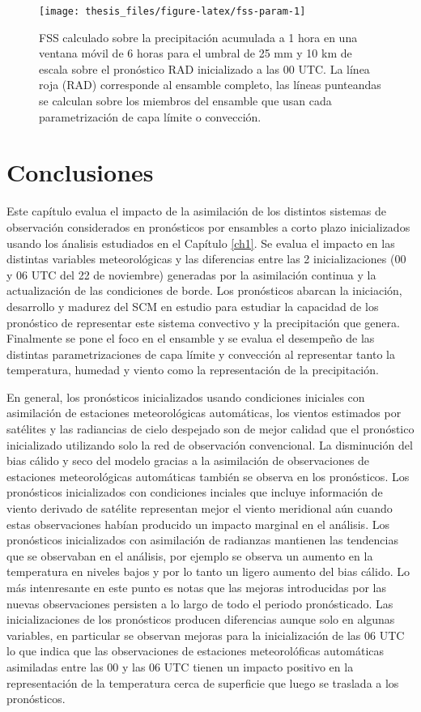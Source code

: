 \documentclass[12pt,oneside,a4paper]{reedthesis}
\begin{document}
\begin{figure}
\texttt{[image: thesis\_files/figure-latex/fss-param-1]} \caption{FSS calculado sobre la precipitación acumulada a 1 hora en una ventana móvil de 6 horas para el umbral de 25 mm y 10 km de escala sobre el pronóstico RAD inicializado a las 00 UTC. La línea roja (RAD) corresponde al ensamble completo, las líneas punteandas se calculan sobre los miembros del ensamble que usan cada parametrización de capa límite o convección.}\label{fig:fss-param}
\end{figure}
\hypertarget{conclusiones-1}{%
\section{Conclusiones}\label{conclusiones-1}}

Este capítulo evalua el impacto de la asimilación de los distintos sistemas de observación considerados en pronósticos por ensambles a corto plazo inicializados usando los ánalisis estudiados en el Capítulo \ref{ch1}. Se evalua el impacto en las distintas variables meteorológicas y las diferencias entre las 2 inicializaciones (00 y 06 UTC del 22 de noviembre) generadas por la asimilación continua y la actualización de las condiciones de borde. Los pronósticos abarcan la iniciación, desarrollo y madurez del SCM en estudio para estudiar la capacidad de los pronóstico de representar este sistema convectivo y la precipitación que genera. Finalmente se pone el foco en el ensamble y se evalua el desempeño de las distintas parametrizaciones de capa límite y convección al representar tanto la temperatura, humedad y viento como la representación de la precipitación.

En general, los pronósticos inicializados usando condiciones iniciales con asimilación de estaciones meteorológicas automáticas, los vientos estimados por satélites y las radiancias de cielo despejado son de mejor calidad que el pronóstico inicializado utilizando solo la red de observación convencional. La disminución del bias cálido y seco del modelo gracias a la asimilación de observaciones de estaciones meteorológicas automáticas también se observa en los pronósticos. Los pronósticos inicializados con condiciones inciales que incluye información de viento derivado de satélite representan mejor el viento meridional aún cuando estas observaciones habían producido un impacto marginal en el análisis. Los pronósticos inicializados con asimilación de radianzas mantienen las tendencias que se observaban en el análisis, por ejemplo se observa un aumento en la temperatura en niveles bajos y por lo tanto un ligero aumento del bias cálido. Lo más intenresante en este punto es notas que las mejoras introducidas por las nuevas observaciones persisten a lo largo de todo el periodo pronósticado. Las inicializaciones de los pronósticos producen diferencias aunque solo en algunas variables, en particular se observan mejoras para la inicialización de las 06 UTC lo que indica que las observaciones de estaciones meteorolóficas automáticas asimiladas entre las 00 y las 06 UTC tienen un impacto positivo en la representación de la temperatura cerca de superficie que luego se traslada a los pronósticos.
\end{document}
